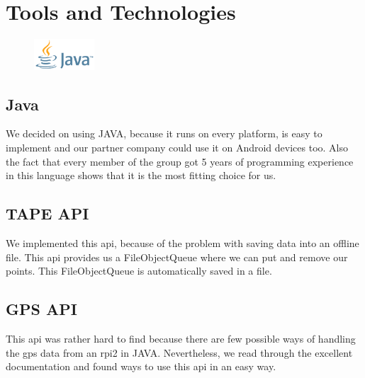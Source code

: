 \chapter{Tools and Technologies}
\begin{figure}
  \begin{center}
    \includegraphics[width=0.2\textwidth] {bilder/java}
  \end{center}
\end{figure}
\section{Java}
We decided on using JAVA, because it runs on every platform, is easy to implement and our partner company could use it on Android devices too. Also the fact that every member of the group got 5 years of programming experience in this language shows that it is the most fitting choice for us.

\section{TAPE API}
We implemented this \gls{api}, because of the problem with saving data into an offline file. This \gls{api} provides us a FileObjectQueue where we can put and remove our points. This FileObjectQueue is automatically saved in a file.

\section{GPS API}
This \gls{api} was rather hard to find because there are few possible ways of handling the \gls{gps} data from an \gls{rpi2} in JAVA. Nevertheless, we read through the excellent documentation and found ways to use this \gls{api} in an easy way.

\newpage
